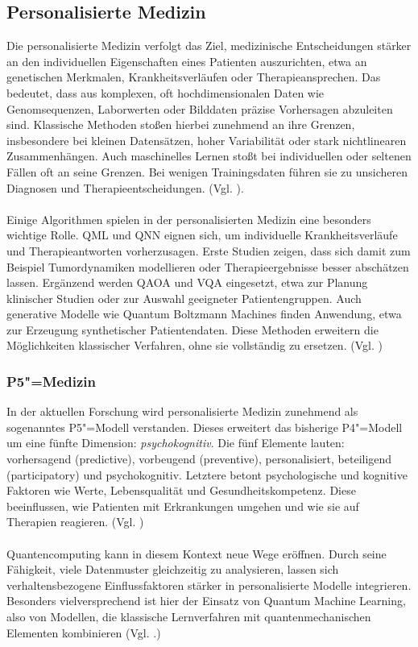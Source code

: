 \subsection{Personalisierte Medizin}
Die personalisierte Medizin verfolgt das Ziel, medizinische Entscheidungen stärker an den individuellen Eigenschaften eines Patienten auszurichten, etwa an genetischen Merkmalen, Krankheitsverläufen oder Therapieansprechen. Das bedeutet, dass aus komplexen, oft hochdimensionalen Daten wie Genomsequenzen, Laborwerten oder Bilddaten präzise Vorhersagen abzuleiten sind. Klassische Methoden stoßen hierbei zunehmend an ihre Grenzen, insbesondere bei kleinen Datensätzen, hoher Variabilität oder stark nichtlinearen Zusammenhängen. Auch maschinelles Lernen stoßt bei individuellen oder seltenen Fällen oft an seine Grenzen. Bei wenigen Trainingsdaten führen sie zu unsicheren Diagnosen und Therapieentscheidungen. (Vgl. \cite{gupta_systematic_2025}).\\
\\
Einige Algorithmen spielen in der personalisierten Medizin eine besonders wichtige Rolle. QML und QNN eignen sich, um individuelle Krankheitsverläufe und Therapieantworten vorherzusagen. Erste Studien zeigen, dass sich damit zum Beispiel Tumordynamiken modellieren oder Therapieergebnisse besser abschätzen lassen. Ergänzend werden QAOA und VQA eingesetzt, etwa zur Planung klinischer Studien oder zur Auswahl geeigneter Patientengruppen. Auch generative Modelle wie Quantum Boltzmann Machines finden Anwendung, etwa zur Erzeugung synthetischer Patientendaten. Diese Methoden erweitern die Möglichkeiten klassischer Verfahren, ohne sie vollständig zu ersetzen. (Vgl. \cite{bertl_quantum_2025})

\subsubsection*{P5"=Medizin}
In der aktuellen Forschung wird personalisierte Medizin zunehmend als sogenanntes P5"=Modell verstanden. Dieses erweitert das bisherige P4"=Modell um eine fünfte Dimension: \textit{psychokognitiv}. Die fünf Elemente lauten: vorhersagend (predictive), vorbeugend (preventive), personalisiert, beteiligend (participatory) und psychokognitiv. Letztere betont psychologische und kognitive Faktoren wie Werte, Lebensqualität und Gesundheitskompetenz. Diese beeinflussen, wie Patienten mit Erkrankungen umgehen und wie sie auf Therapien reagieren. (Vgl. \cite{gorini_p5_2011})\\
\\
Quantencomputing kann in diesem Kontext neue Wege eröffnen. Durch seine Fähigkeit, viele Datenmuster gleichzeitig zu analysieren, lassen sich verhaltensbezogene Einflussfaktoren stärker in personalisierte Modelle integrieren. Besonders vielversprechend ist hier der Einsatz von Quantum Machine Learning, also von Modellen, die klassische Lernverfahren mit quantenmechanischen Elementen kombinieren (Vgl. \cite{bertl_quantum_2025}.)

